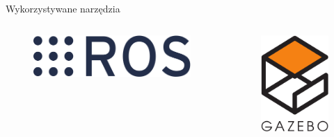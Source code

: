 \begin{frame}
{Wykorzystywane narzędzia}
	\begin{columns}
		\begin{column}{0.25\textwidth}
			\begin{figure}
				\begin{center}
					\includegraphics[width=\textwidth]{img/Ros_logo.png}
				\end{center}
			\end{figure}
		\end{column}
		\begin{column}{0.25\textwidth}  %
						\begin{figure}
				\begin{center}
					\includegraphics[width=\textwidth]{img/Gazebo_logo.png}		

\end{center}
\end{figure}
\end{column}
\end{columns}
\end{frame}
